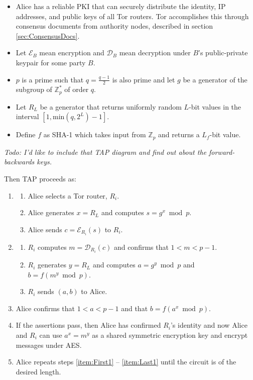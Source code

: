 \begin{itemize}
	\item Alice has a reliable PKI that can securely distribute the identity, IP addresses, and public keys of all Tor routers. Tor accomplishes this through consensus documents from authority nodes, described in section \ref{sec:ConsensusDocs}.
	\item Let $ \mathcal{E}_{B} $ mean encryption and $ \mathcal{D}_{B} $ mean decryption under $ B $'s public-private keypair for some party $ B $.
	\item $ p $ is a prime such that $ q = \frac{q - 1}{2} $ is also prime and let $ g $ be a generator of the subgroup of $ \mathbb{Z}^{*}_{p} $ of order $ q $.
	\item Let $ R_{L} $ be a generator that returns uniformly random $ L $-bit values in the interval $ [1, \textrm{min}(q, 2 ^ L) - 1] $.
	\item Define $ f $ as SHA-1 which takes input from $ \mathbb{Z}_{p} $ and returns a $ L_{f} $-bit value.
\end{itemize}

\emph{Todo: I'd like to include that TAP diagram \cite{ling2013protocol}\cite{dingledine2004tor} and find out about the forward-backwards keys.}

Then TAP proceeds as:

\begin{enumerate}
	\item \label{item:First1}
		\begin{enumerate}
			\item Alice selects a Tor router, $ R_{i} $.
			\item Alice generates $ x = R_{L} $ and computes $ s = g ^ x \bmod{p} $.
			\item Alice sends $ c = \mathcal{E}_{R_{i}}(s) $ to $ R_{i} $.
		\end{enumerate}
	\item
		\begin{enumerate}
			\item $ R_{i} $ computes $ m = \mathcal{D}_{R_{i}}(c) $ and confirms that $ 1 < m < p - 1 $.
			\item $ R_{i} $ generates $ y = R_{L} $ and computes $ a = g ^ y \bmod{p} $ and $ b = f(m ^ y \bmod{p}) $.
			\item $ R_{i} $ sends $ (a, b) $ to Alice.
		\end{enumerate}
	\item
		Alice confirms that $ 1 < a < p - 1 $ and that $ b = f(a ^ x \bmod{p}) $.
	\item \label{item:Last1}
		If the assertions pass, then Alice has confirmed $ R_{i} $'s identity and now Alice and $ R_{i} $ can use $ a ^ x = m ^ y $ as a shared symmetric encryption key and encrypt messages under AES.
	\item 
		Alice repeats steps \ref{item:First1} -- \ref{item:Last1} until the circuit is of the desired length.
\end{enumerate}

